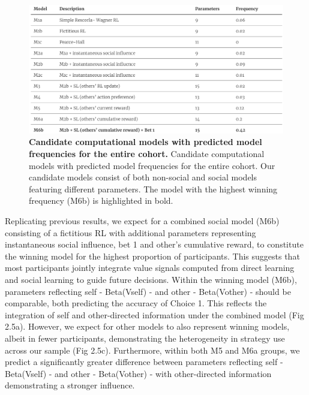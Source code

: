 \documentclass[12pt,a4paper,oneside,]{book} %
\begin{document}
\begin{figure}
\includegraphics[width=1\linewidth]{figures/models} \caption{{\textbf{Candidate computational models with predicted model frequencies for the entire cohort.} Candidate computational models with predicted model frequencies for the entire cohort. Our candidate models consist of both non-social and social models featuring different parameters. The model with the highest winning frequency (M6b) is highlighted in bold.}}\label{fig:figure-4-models}
\end{figure}



Replicating previous results, we expect for a combined social model (M6b) consisting of a fictitious RL with additional parameters representing instantaneous social influence, bet 1 and other's cumulative reward, to constitute the winning model for the highest proportion of participants. This suggests that most participants jointly integrate value signals computed from direct learning and social learning to guide future decisions. Within the winning model (M6b), parameters reflecting self - Beta(Vself) - and other - Beta(Vother) - should be comparable, both predicting the accuracy of Choice 1. This reflects the integration of self and other-directed information under the combined model (Fig 2.5a). However, we expect for other models to also represent winning models, albeit in fewer participants, demonstrating the heterogeneity in strategy use across our sample (Fig 2.5c). Furthermore, within both M5 and M6a groups, we predict a significantly greater difference between parameters reflecting self - Beta(Vself) - and other - Beta(Vother) - with other-directed information demonstrating a stronger influence.
\end{document}
